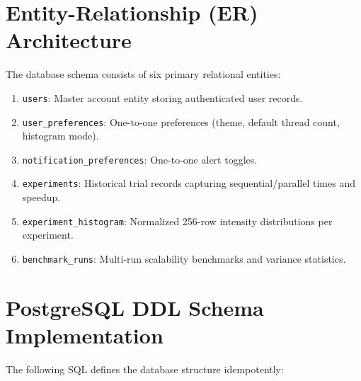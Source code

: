 \documentclass[12pt,a4paper,oneside]{report}
\begin{document}
\section{Entity-Relationship (ER) Architecture}
The database schema consists of six primary relational entities:
\begin{enumerate}
    \item \texttt{users}: Master account entity storing authenticated user records.
    \item \texttt{user\_preferences}: One-to-one preferences (theme, default thread count, histogram mode).
    \item \texttt{notification\_preferences}: One-to-one alert toggles.
    \item \texttt{experiments}: Historical trial records capturing sequential/parallel times and speedup.
    \item \texttt{experiment\_histogram}: Normalized 256-row intensity distributions per experiment.
    \item \texttt{benchmark\_runs}: Multi-run scalability benchmarks and variance statistics.
\end{enumerate}

\section{PostgreSQL DDL Schema Implementation}
The following SQL defines the database structure idempotently:
\end{document}
